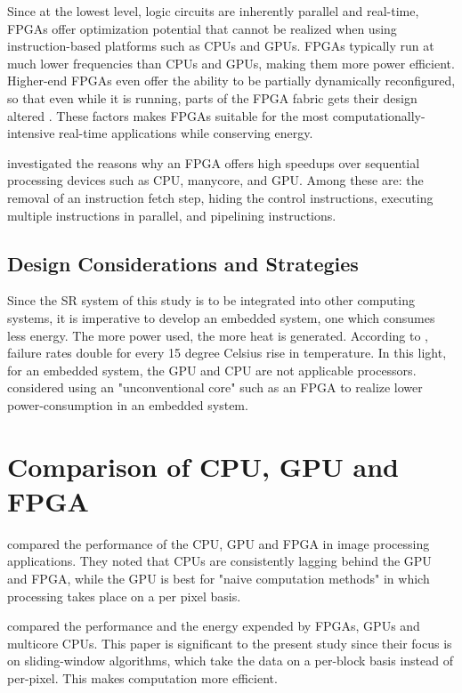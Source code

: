 Since at the lowest level, logic circuits are inherently parallel and real-time, FPGAs offer optimization potential that cannot be realized when using instruction-based platforms such as CPUs and GPUs. FPGAs typically run at much lower frequencies than CPUs and GPUs, making them more power efficient.
Higher-end FPGAs even offer the ability to be partially dynamically reconfigured, so that even while it is running, parts of the FPGA fabric gets their design altered \citep{Dye2012}.
These factors makes FPGAs suitable for the most computationally-intensive real-time applications while conserving energy.
	
\cite{Sirowy2008} investigated the reasons why an FPGA offers high speedups over sequential processing devices such as CPU, manycore, and GPU. 
Among these are: the removal of an instruction fetch step, hiding the control instructions, executing multiple instructions in parallel, and pipelining instructions.


\subsection{Design Considerations and Strategies}
Since the SR system of this study is to be integrated into other computing systems, it is imperative to develop an embedded system, one which consumes less energy.
The more power used, the more heat is generated. According to \cite{Anderson2003}, failure rates double for every 15 degree Celsius rise in temperature.
In this light, for an embedded system, the GPU and CPU are not applicable processors.
\cite{Mittal2014} considered using an "unconventional core" such as an FPGA to realize lower power-consumption in an embedded system.

\section{Comparison of CPU, GPU and FPGA}

\cite{Asano2009} compared the performance of the CPU, GPU and FPGA in image processing applications. 
They noted that CPUs are consistently lagging behind the GPU and FPGA, while the GPU is best for "naive computation methods" in which processing takes place on a per pixel basis.

\cite{Fowers2012} compared the performance and the energy expended by FPGAs, GPUs and multicore CPUs. 
This paper is significant to the present study since their focus is on sliding-window algorithms, which take the data on a per-block basis instead of per-pixel. This makes computation more efficient.

